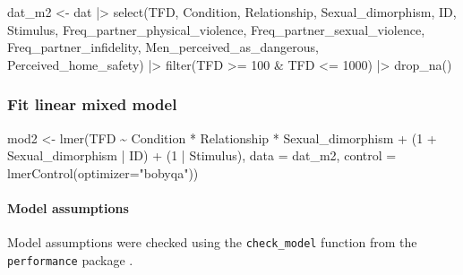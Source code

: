 \documentclass[
  bookmarksnumbered]{article}
\newenvironment{Shaded}{\begin{snugshade}}{\end{snugshade}}
\newcommand{\AttributeTok}[1]{\textcolor[rgb]{0.80,0.80,0.80}{#1}}
\newcommand{\DecValTok}[1]{\textcolor[rgb]{0.86,0.86,0.80}{#1}}
\newcommand{\FunctionTok}[1]{\textcolor[rgb]{0.94,0.94,0.56}{#1}}
\newcommand{\NormalTok}[1]{\textcolor[rgb]{0.80,0.80,0.80}{#1}}
\newcommand{\OtherTok}[1]{\textcolor[rgb]{0.94,0.94,0.56}{#1}}
\newcommand{\SpecialCharTok}[1]{\textcolor[rgb]{0.86,0.64,0.64}{#1}}
\newcommand{\StringTok}[1]{\textcolor[rgb]{0.80,0.58,0.58}{#1}}
\begin{document}
\begin{Shaded}
\begin{Highlighting}[]
\NormalTok{dat\_m2 }\OtherTok{\textless{}{-}}\NormalTok{ dat }\SpecialCharTok{|\textgreater{}} 
  \FunctionTok{select}\NormalTok{(TFD, Condition, Relationship, Sexual\_dimorphism,}
\NormalTok{         ID, Stimulus,}
\NormalTok{         Freq\_partner\_physical\_violence, Freq\_partner\_sexual\_violence,}
\NormalTok{         Freq\_partner\_infidelity, Men\_perceived\_as\_dangerous,}
\NormalTok{         Perceived\_home\_safety) }\SpecialCharTok{|\textgreater{}} 
  \FunctionTok{filter}\NormalTok{(TFD }\SpecialCharTok{\textgreater{}=} \DecValTok{100} \SpecialCharTok{\&}\NormalTok{ TFD }\SpecialCharTok{\textless{}=} \DecValTok{1000}\NormalTok{) }\SpecialCharTok{|\textgreater{}} 
  \FunctionTok{drop\_na}\NormalTok{()}
\end{Highlighting}
\end{Shaded}

\subsubsection{Fit linear mixed model}\label{fit-linear-mixed-model-1}

\begin{Shaded}
\begin{Highlighting}[]
\NormalTok{mod2 }\OtherTok{\textless{}{-}} \FunctionTok{lmer}\NormalTok{(TFD }\SpecialCharTok{\textasciitilde{}}\NormalTok{ Condition }\SpecialCharTok{*}\NormalTok{ Relationship }\SpecialCharTok{*}\NormalTok{ Sexual\_dimorphism }\SpecialCharTok{+}
\NormalTok{               (}\DecValTok{1} \SpecialCharTok{+}\NormalTok{ Sexual\_dimorphism }\SpecialCharTok{|}\NormalTok{ ID) }\SpecialCharTok{+}\NormalTok{ (}\DecValTok{1} \SpecialCharTok{|}\NormalTok{ Stimulus), }
             \AttributeTok{data =}\NormalTok{ dat\_m2,}
             \AttributeTok{control =} \FunctionTok{lmerControl}\NormalTok{(}\AttributeTok{optimizer=}\StringTok{"bobyqa"}\NormalTok{))}
\end{Highlighting}
\end{Shaded}

\paragraph{Model assumptions}\label{model-assumptions-1}

Model assumptions were checked using the \texttt{check\_model} function from the \texttt{performance} package \autocite{ludecke2021}.
\end{document}
